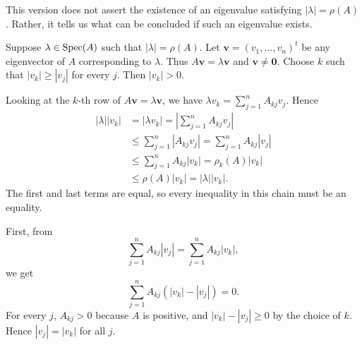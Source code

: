 \begin{remark}
This version does not assert the existence of an eigenvalue satisfying $|\lambda|=\rho(A)$. Rather, it tells us what can be concluded if such an eigenvalue exists.
\end{remark}

\begin{pfbox}
Suppose $\lambda\in\operatorname{Spec}(A)$ such that $|\lambda|=\rho(A)$. Let $\mathbf{v}=(v_1,\dots,v_n)^t$ be any eigenvector of $A$ corresponding to $\lambda$. Thus $A\mathbf{v}=\lambda\mathbf{v}$ and $\mathbf{v}\neq\mathbf{0}$. Choose $k$ such that $|v_k|\ge |v_j|$ for every $j$. Then $|v_k|>0$.

Looking at the $k$-th row of $A\mathbf{v}=\lambda\mathbf{v}$, we have $\lambda v_k=\displaystyle\sum_{j=1}^n A_{kj}v_j$. Hence
\[
\begin{aligned}
|\lambda||v_k|
&=
|\lambda v_k|
=
\left|\sum_{j=1}^n A_{kj}v_j\right|\\
&\le
\sum_{j=1}^n |A_{kj}v_j|
=
\sum_{j=1}^n A_{kj}|v_j|\\
&\le
\sum_{j=1}^n A_{kj}|v_k|
=
\rho_k(A)|v_k|\\
&\le
\rho(A)|v_k|
=
|\lambda||v_k|.
\end{aligned}
\]
The first and last terms are equal, so every inequality in this chain must be an equality.

First, from
\[
\sum_{j=1}^n A_{kj}|v_j|
=
\sum_{j=1}^n A_{kj}|v_k|,
\]
we get
\[
\sum_{j=1}^n A_{kj}(|v_k|-|v_j|)=0.
\]
For every $j$, $A_{kj}>0$ because $A$ is positive, and $|v_k|-|v_j|\ge0$ by the choice of $k$. Hence $|v_j|=|v_k|$ for all $j$.


\end{pfbox}
